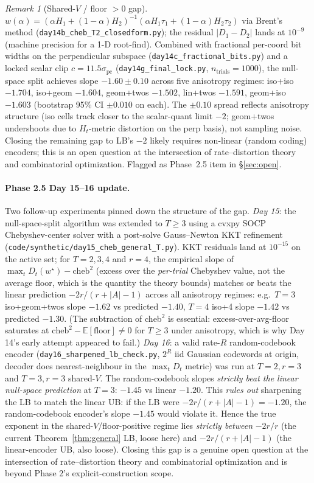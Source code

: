 \documentclass{article}
\theoremstyle{remark}
\newtheorem{remark}[theorem]{Remark}
\newcommand{\E}{\mathbb{E}}
\begin{document}
\begin{remark}[Shared-$V$ / floor $>0$ gap]
$w(\alpha) = (\alpha H_1 + (1-\alpha) H_2)^{-1}(\alpha H_1 \tau_1
+ (1-\alpha) H_2 \tau_2)$ via Brent's method
(\texttt{day14b\_cheb\_T2\_closedform.py}); the residual $|D_1-D_2|$
lands at $10^{-9}$ (machine precision for a 1-D root-find). Combined
with fractional per-coord bit widths on the perpendicular subspace
(\texttt{day14c\_fractional\_bits.py}) and a locked scalar clip
$c = 11.5\sigma_{\mathrm{pc}}$
(\texttt{day14g\_final\_lock.py}, $n_{\mathrm{trials}}=1000$), the
null-space split achieves slope $-1.60 \pm 0.10$ across five
anisotropy regimes: iso+iso $-1.704$, iso+geom $-1.604$, geom+twos
$-1.502$, lin+twos $-1.591$, geom+iso $-1.603$ (bootstrap 95\% CI
$\pm 0.010$ on each). The $\pm 0.10$ spread reflects anisotropy
structure (iso cells track closer to the scalar-quant limit $-2$;
geom+twos undershoots due to $H_t$-metric distortion on the perp
basis), not sampling noise. Closing the remaining gap to LB's
$-2$ likely requires non-linear (random coding) encoders; this is
an open question at the intersection of rate--distortion theory and
combinatorial optimization. Flagged as Phase~2.5 item in
\S\ref{sec:open}.

\paragraph{Phase 2.5 Day 15--16 update.}
Two follow-up experiments pinned down the structure of the gap.
\emph{Day 15}: the null-space-split algorithm was extended to $T\geq 3$
using a cvxpy SOCP Chebyshev-center solver with a post-solve
Gauss--Newton KKT refinement
(\texttt{code/synthetic/day15\_cheb\_general\_T.py}). KKT residuals
land at $10^{-15}$ on the active set; for $T=2,3,4$ and $r=4$, the
empirical slope of $\max_t D_t(w^\star) - \mathrm{cheb}^2$ (excess
over the \emph{per-trial} Chebyshev value, not the average floor,
which is the quantity the theory bounds) matches or beats the linear
prediction $-2r/(r + |A| - 1)$ across all anisotropy regimes: e.g.\
$T=3$ iso+geom+twos slope $-1.62$ vs predicted $-1.40$, $T=4$ iso+4
slope $-1.42$ vs predicted $-1.30$. (The subtraction of cheb$^2$ is
essential: excess-over-avg-floor saturates at
$\mathrm{cheb}^2 - \E[\mathrm{floor}] \neq 0$ for $T\geq 3$ under
anisotropy, which is why Day 14's early attempt appeared to fail.)
\emph{Day 16}: a valid rate-$R$ random-codebook encoder
(\texttt{day16\_sharpened\_lb\_check.py}, $2^R$ iid Gaussian codewords
at origin, decoder does nearest-neighbour in the $\max_t D_t$ metric)
was run at $T=2, r=3$ and $T=3, r=3$ shared-$V$. The random-codebook
slopes \emph{strictly beat the linear null-space prediction} at
$T=3$: $-1.45$ vs linear $-1.20$. This \emph{rules out} sharpening
the LB to match the linear UB: if the LB were $-2r/(r+|A|-1) = -1.20$,
the random-codebook encoder's slope $-1.45$ would violate it. Hence
the true exponent in the shared-$V$/floor-positive regime lies
\emph{strictly between} $-2r/r$ (the current Theorem~\ref{thm:general} LB,
loose here) and $-2r/(r+|A|-1)$ (the linear-encoder UB, also loose).
Closing this gap is a genuine open question at the intersection of
rate--distortion theory and combinatorial optimization and is beyond
Phase 2's explicit-construction scope.
\end{remark}
\end{document}
